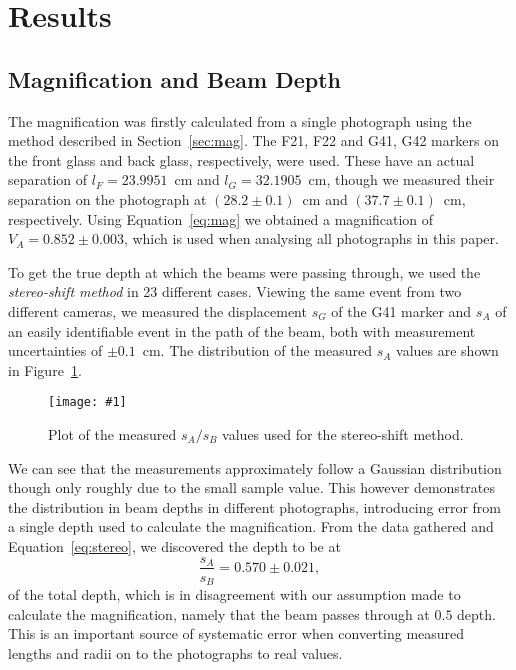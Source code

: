 \documentclass[twocolumn]{article}
\newcommand{\insertFigure}[1]{%
   \texttt{[image: \#1]}%
}
\begin{document}
\section{Results} \label{sec:res}
\subsection{Magnification and Beam Depth}
The magnification was firstly calculated from a single photograph using the method described in Section~\ref{sec:mag}. The F21, F22 and G41, G42 markers on the front glass and back glass, respectively, were used. These have an actual separation of $l_F = 23.9951$~cm and $l_G = 32.1905$~cm, though we measured their separation on the photograph at $(28.2 \pm 0.1)$~cm and $(37.7 \pm 0.1)$~cm, respectively. Using Equation~\ref{eq:mag} we obtained a magnification of $V_A = 0.852 \pm 0.003$, which is used when analysing all photographs in this paper. \\

\par To get the true depth at which the beams were passing through, we used the \textit{stereo-shift method} in 23 different cases. Viewing the same event from two different cameras, we measured the displacement $s_G$ of the G41 marker and $s_A$ of an easily identifiable event in the path of the beam, both with measurement uncertainties of $\pm 0.1$~cm. The distribution of the measured $s_A$ values are shown in Figure~\ref{fig:box}.
\begin{figure}[!h]
	\centering
	\insertFigure{box.png}
	\caption{Plot of the measured $s_A/s_B$ values used for the stereo-shift method.}
	\label{fig:box}
\end{figure}
We can see that the measurements approximately follow a Gaussian distribution though only roughly due to the small sample value. This however demonstrates the distribution in beam depths in different photographs, introducing error from a single depth used to calculate the magnification. From the data gathered and Equation~\ref{eq:stereo}, we discovered the depth to be at
\begin{equation*}
\frac{s_A}{s_B} = 0.570 \pm 0.021,
\end{equation*}
of the total depth, which is in disagreement with our assumption made to calculate the magnification, namely that the beam passes through at $0.5$ depth. This is an important source of systematic error when converting measured lengths and radii on to the photographs to real values.
\end{document}
